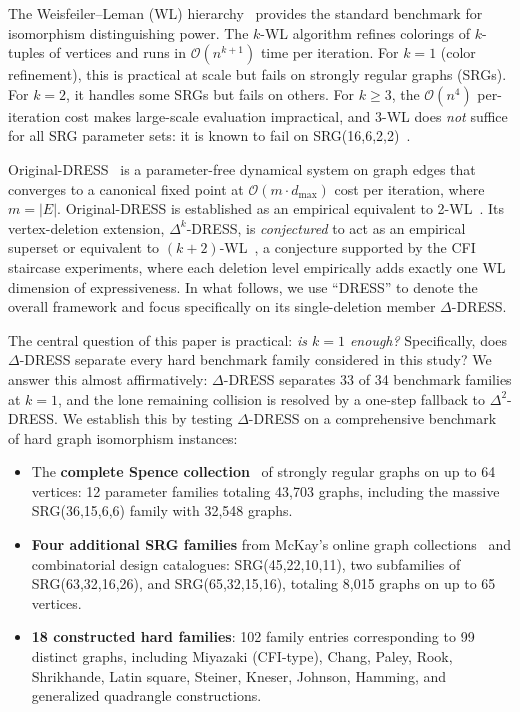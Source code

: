 \documentclass[11pt,a4paper]{article}
\begin{document}
The Weisfeiler--Leman (WL) hierarchy~\cite{weisfeiler1968reduction} provides the standard benchmark for isomorphism distinguishing power.
The $k$-WL algorithm refines colorings of $k$-tuples of vertices and runs in $\mathcal{O}(n^{k+1})$ time per iteration.
For $k=1$ (color refinement), this is practical at scale but fails on strongly regular graphs (SRGs).
For $k=2$, it handles some SRGs but fails on others.
For $k \geq 3$, the $\mathcal{O}(n^4)$ per-iteration cost makes large-scale evaluation impractical, and 3-WL does \emph{not} suffice for all SRG parameter sets: it is known to fail on SRG(16,6,2,2)~\cite{cai1992optimal}.

Original-DRESS~\cite{castrillo2018dynamicstructuralsimilaritygraphs, castrillo2026dress} is a parameter-free dynamical system on graph edges that converges to a canonical fixed point at $\mathcal{O}(m \cdot d_{\max})$ cost per iteration, where $m = |E|$.
Original-DRESS is established as an empirical equivalent to 2-WL~\cite{castrillo2026dress}.
Its vertex-deletion extension, $\Delta^k$-DRESS, is \emph{conjectured} to act as an empirical superset or equivalent to $(k+2)$-WL~\cite{castrillo2026dress}, a conjecture supported by the CFI staircase experiments, where each deletion level empirically adds exactly one WL dimension of expressiveness.
In what follows, we use ``DRESS'' to denote the overall framework and focus specifically on its single-deletion member $\Delta$-DRESS.

The central question of this paper is practical: \emph{is $k=1$ enough?}
Specifically, does $\Delta$-DRESS separate every hard benchmark family considered in this study?
We answer this almost affirmatively: $\Delta$-DRESS separates 33 of 34 benchmark families at $k=1$, and the lone remaining collision is resolved by a one-step fallback to $\Delta^2$-DRESS. We establish this by testing $\Delta$-DRESS on a comprehensive benchmark of hard graph isomorphism instances:

\begin{itemize}
    \item The \textbf{complete Spence collection}~\cite{spence2024srg} of strongly regular graphs on up to 64 vertices: 12 parameter families totaling 43{,}703 graphs, including the massive SRG(36,15,6,6) family with 32{,}548 graphs.

    \item \textbf{Four additional SRG families} from McKay's online graph collections~\cite{mckaygraphs} and combinatorial design catalogues: SRG(45,22,10,11), two subfamilies of SRG(63,32,16,26), and SRG(65,32,15,16), totaling 8{,}015 graphs on up to 65 vertices.

    \item \textbf{18 constructed hard families}: 102 family entries corresponding to 99 distinct graphs, including Miyazaki (CFI-type), Chang, Paley, Rook, Shrikhande, Latin square, Steiner, Kneser, Johnson, Hamming, and generalized quadrangle constructions.
\end{itemize}
\end{document}
